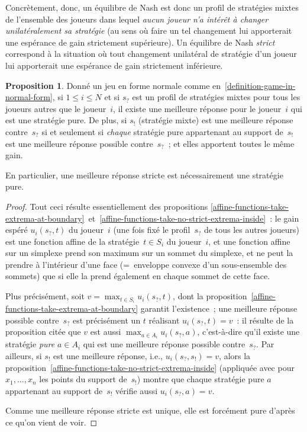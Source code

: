 \documentclass[12pt,a4paper]{article}
\theoremstyle{definition}
\newtheorem{prop}[comcnt]{Proposition}
\begin{document}
Concrètement, donc, un équilibre de Nash est donc un profil de
stratégies mixtes de l'ensemble des joueurs dans lequel \emph{aucun
  joueur n'a intérêt à changer unilatéralement sa stratégie} (au sens
où faire un tel changement lui apporterait une espérance de gain
strictement supérieure).  Un équilibre de Nash \emph{strict}
correspond à la situation où tout changement unilatéral de stratégie
d'un joueur lui apporterait une espérance de gain strictement
inférieure.

\begin{prop}\label{stupid-remark-best-mixed-strategies}
Donné un jeu en forme normale comme
en \ref{definition-game-in-normal-form}, si $1 \leq i \leq N$ et si
$s_?$ est un profil de stratégies mixtes pour tous les joueurs autres
que le joueur $i$, il existe une meilleure réponse pour le joueur $i$
qui est une stratégie pure.  De plus, si $s_!$ (stratégie mixte) est
une meilleure réponse contre $s_?$ si et seulement si \emph{chaque}
stratégie pure appartenant au support de $s_!$ est une meilleure
réponse possible contre $s_?$ ; et elles apportent toutes le même
gain.

En particulier, une meilleure réponse stricte est nécessairement une
stratégie pure.
\end{prop}
\begin{proof}
Tout ceci résulte essentiellement des propositions
\ref{affine-functions-take-extrema-at-boundary} et \ref{affine-functions-take-no-strict-extrema-inside} :
le gain espéré $u_i(s_?,t)$ du joueur $i$ (une fois fixé le
profil $s_?$ de tous les autres joueurs) est une fonction affine de la
stratégie $t \in S_i$ du joueur $i$, et une fonction affine sur un
simplexe prend son maximum sur un sommet du simplexe, et ne peut la
prendre à l'intérieur d'une face (= enveloppe convexe d'un
sous-ensemble des sommets) que si elle la prend également en chaque
sommet de cette face.

Plus précisément, soit $v = \max_{t \in S_i} u_i(s_?,t)$, dont la
proposition \ref{affine-functions-take-extrema-at-boundary} garantit
l'existence ; une meilleure réponse possible contre $s_?$ est
précisément un $t$ réalisant $u_i(s_?,t) = v$ : il résulte de la
proposition citée que $v$ est aussi $\max_{a \in A_i} u_i(s_?,a)$,
c'est-à-dire qu'il existe une stratégie \emph{pure} $a \in A_i$ qui
est une meilleure réponse possible contre $s_?$.  Par ailleurs, si
$s_!$ est une meilleure réponse, i.e., $u_i(s_?,s_!) = v$, alors la
proposition \ref{affine-functions-take-no-strict-extrema-inside}
(appliquée avec pour $x_1,\ldots,x_n$ les points du support de $s_!$)
montre que chaque stratégie pure $a$ appartenant au support de $s_!$
vérifie aussi $u_i(s_?,a) = v$.

Comme une meilleure réponse stricte est unique, elle est forcément
pure d'après ce qu'on vient de voir.
\end{proof}
\end{document}
